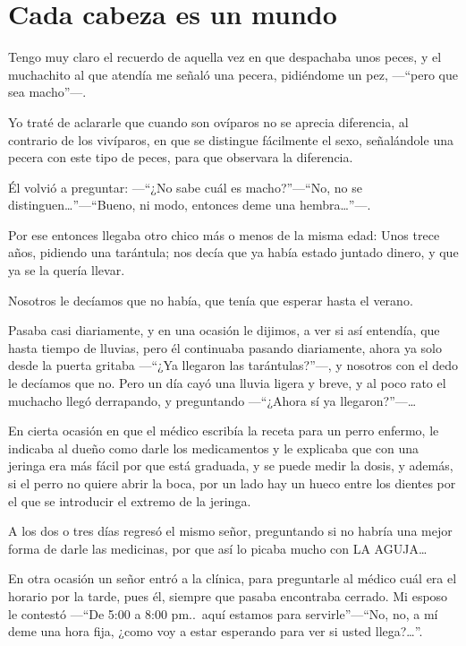 \documentclass[letterpaper, 12pt]{book}
\begin{document}
\chapter{Cada cabeza es un mundo}
Tengo muy claro el recuerdo de aquella vez en que despachaba unos peces, y el muchachito al que atendía me señaló una pecera, pidiéndome un pez, ---``pero que sea macho''---.

Yo traté de aclararle que cuando son ovíparos no se aprecia diferencia, al contrario de los vivíparos, en que se distingue fácilmente el sexo, señalándole una pecera con este tipo de peces, para que observara la diferencia.

Él volvió a preguntar: ---``¿No sabe cuál es macho?''---``No, no se distinguen\ldots''---``Bueno, ni modo, entonces deme una hembra\ldots''---.

Por ese entonces llegaba otro chico más o menos de la misma edad: Unos trece años, pidiendo una tarántula; nos decía que ya había estado juntado dinero, y que ya se la quería llevar.

Nosotros le decíamos que no había, que tenía que esperar hasta el verano.

Pasaba casi diariamente, y en una ocasión le dijimos, a ver si así entendía, que hasta tiempo de lluvias, pero él continuaba pasando diariamente, ahora ya solo desde la puerta gritaba ---``¿Ya llegaron las tarántulas?''---, y nosotros con el dedo le decíamos que no. Pero un día cayó una lluvia ligera y breve, y al poco rato el muchacho llegó derrapando, y preguntando ---``¿Ahora sí ya llegaron?''---\ldots

En cierta ocasión en que el médico escribía la receta para un perro enfermo, le indicaba al dueño como darle los medicamentos y le explicaba que con una jeringa era más fácil por que está graduada, y se puede medir la dosis, y además, si el perro no quiere abrir la boca, por un lado hay un hueco entre los dientes por el que se introducir el extremo de la jeringa.

A los dos o tres días regresó el mismo señor, preguntando si no habría una mejor forma de darle las medicinas, por que así lo picaba mucho con LA AGUJA\ldots

En otra ocasión un señor entró a la clínica, para preguntarle al médico cuál era el horario por la tarde, pues él, siempre que pasaba encontraba cerrado. Mi esposo le contestó ---``De 5:00 a 8:00 pm..\ aquí estamos para servirle''---``No, no, a mí deme una hora fija, ¿como voy a estar esperando para ver si usted llega?\ldots''.
\end{document}
